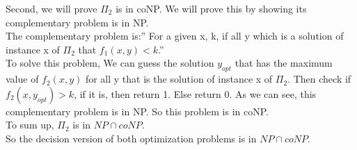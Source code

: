 \documentclass[12pt]{article}
\begin{document}
Second, we will prove $\Pi_2$ is in coNP. We will prove this by
showing its complementary problem is in NP. \\

The complementary problem is:'' For a given x, k, if all y which is a
solution of instance x of $\Pi_2$ that $f_1(x, y) < k$.'' \\

To solve this problem, We can guess the solution $y_{opt}$ that has
the maximum value of $f_2(x,y)$ for all y that is the solution of
instance x of $\Pi_2$. Then check if $f_2(x, y_{opt}) > k$, if it is,
then return 1. Else return 0. As we can see, this complementary
problem is in NP. So this problem is in coNP. \\

To sum up, $\Pi_2$ is in $NP \cap coNP$. \\

So the decision version of both optimization problems is in $NP \cap
coNP$. \\
\end{document}
